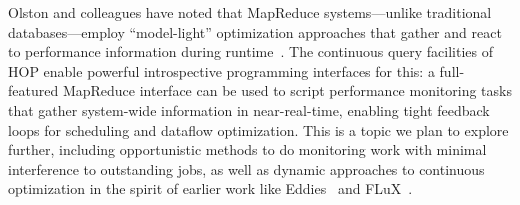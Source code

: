 Olston and colleagues have noted that MapReduce systems---unlike traditional databases---employ ``model-light'' optimization approaches that gather and react to performance information during runtime~\cite{olston-usenix08}.  The continuous query facilities of HOP enable powerful introspective programming interfaces for this: a full-featured MapReduce interface can be used to script performance monitoring tasks that gather system-wide information in near-real-time, enabling tight feedback loops for scheduling and dataflow optimization.  This is a topic we plan to explore further, including opportunistic methods to do monitoring work with minimal interference to outstanding jobs, as well as dynamic approaches to continuous optimization in the spirit of earlier work like Eddies~\cite{eddies} and FLuX~\cite{flux-lb}.




